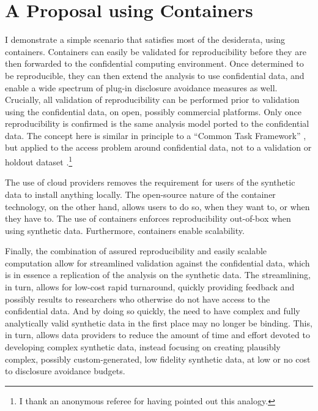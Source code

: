 \documentclass[]{hdsr}
\begin{document}
\section{A Proposal using Containers}
\label{sec:proposal}
I demonstrate a simple scenario that satisfies most of the desiderata,  using containers.  Containers can easily be validated for reproducibility before they are then forwarded to the confidential computing environment. Once determined to be reproducible, they can then extend the analysis to use confidential data, and enable a wide spectrum of plug-in disclosure avoidance measures as well. Crucially, all validation of reproducibility can be performed prior to validation using the confidential data, on open, possibly commercial platforms. Only once reproducibility is confirmed is the same analysis model ported to the confidential data. The concept here is similar in principle to a ``Common Task Framework'' \citep{liberman_obituary_2010,liberman_reproducible_2014,liu_successes_2019}, but applied to the access problem around confidential data, not to a validation or holdout dataset \citep{liu_successes_2019,donoho_data_2024}.\footnote{I thank an anonymous referee for having pointed out this analogy.}  

The use of cloud providers removes the requirement for users of the synthetic data to install anything locally. The open-source nature of the container technology, on the other hand, allows users to do so, when they want to, or when they have to. The use of containers enforces reproducibility out-of-box when using synthetic data. Furthermore, containers enable scalability. 

Finally, the combination of assured reproducibility and easily scalable computation allow for streamlined validation against the confidential data, which is in essence a replication of the analysis on the synthetic data. The streamlining, in turn, allows for low-cost rapid turnaround, quickly providing feedback and possibly results to researchers who otherwise do not have access to the confidential data. And by doing so quickly, the need to have complex and fully analytically valid synthetic data in the first place may no longer be binding. This, in turn, allows data providers to reduce the amount of time and effort devoted to developing complex synthetic data, instead focusing on creating plausibly complex, possibly custom-generated, low fidelity synthetic data, at low or no cost to disclosure avoidance budgets.
\end{document}

